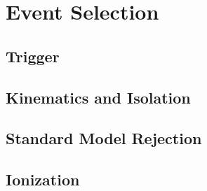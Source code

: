 \chapter{Event Selection}

\label{ch:selection}

\section{Trigger}


\section{Kinematics and Isolation}


\section{Standard Model Rejection}


\section{Ionization}

